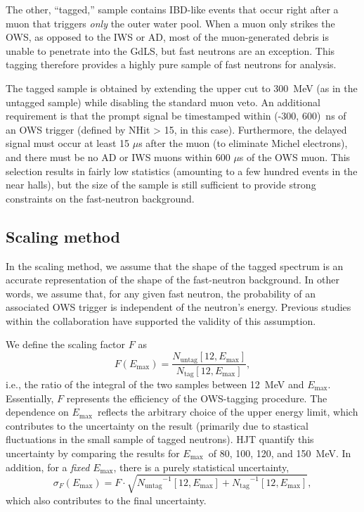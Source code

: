 \documentclass[../thesis.tex]{subfiles}
\begin{document}
The other, ``tagged,'' sample contains IBD-like events that occur right after a
muon that triggers \emph{only} the outer water pool. When a muon only strikes
the OWS, as opposed to the IWS or AD, most of the muon-generated debris is
unable to penetrate into the GdLS, but fast neutrons are an exception. This
tagging therefore provides a highly pure sample of fast neutrons for analysis.

The tagged sample is obtained by extending the upper cut to 300~MeV (as in the
untagged sample) while disabling the standard muon veto. An additional
requirement is that the prompt signal be timestamped within (-300, 600)~ns of an
OWS trigger (defined by NHit > 15, in this case). Furthermore, the delayed
signal must occur at least 15 $\mu$s after the muon (to eliminate Michel
electrons), and there must be no AD or IWS muons within 600 $\mu$s of the OWS
muon. This selection results in fairly low statistics (amounting to a few
hundred events in the near halls), but the size of the sample is still
sufficient to provide strong constraints on the fast-neutron background.

\subsection{Scaling method}
\label{sec:fastn_scaling}

In the scaling method, we assume that the shape of the tagged spectrum is an
accurate representation of the shape of the fast-neutron background. In other
words, we assume that, for any given fast neutron, the probability of an
associated OWS trigger is independent of the neutron's energy. Previous studies
within the collaboration have supported the validity of this assumption.

\def\emax{\ensuremath{E_\mathrm{max}}} \def\ntag{\ensuremath{N_\mathrm{tag}}}
\def\nuntag{\ensuremath{N_\mathrm{untag}}}

We define the scaling factor $F$ as \[ F(\emax) = \frac{\nuntag[12,
    \emax]}{\ntag[12, \emax]}, \] i.e., the ratio of the integral of the two
samples between 12~MeV and \emax. Essentially, $F$ represents the efficiency of
the OWS-tagging procedure. The dependence on \emax\ reflects the arbitrary
choice of the upper energy limit, which contributes to the uncertainty on the
result (primarily due to stastical fluctuations in the small sample of tagged
neutrons). HJT quantify this uncertainty by comparing the results for \emax\ of
80, 100, 120, and 150~MeV. In addition, for a \emph{fixed} \emax, there is a
purely statistical uncertainty,
\[ \sigma_F(\emax) = F \cdot \sqrt{\nuntag^{-1}[12, \emax] + \ntag^{-1}[12,
    \emax]},
\]
which also contributes to the final uncertainty.
\end{document}

